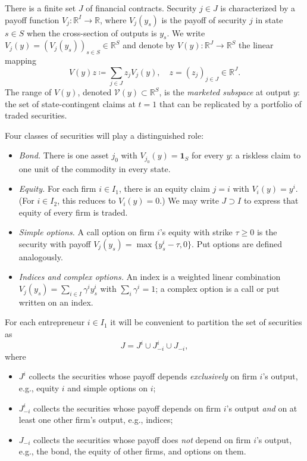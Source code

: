 \documentclass[11pt,a4paper,oneside]{book}
\def\R{\mathbb{R}}
\def\1{\mathbf{1}}
\def\geq{\geqslant}
\theoremstyle{plain}
\theoremstyle{definition}
\theoremstyle{remark}
\numberwithin{equation}{chapter}
\begin{document}
There is a finite set $J$ of financial contracts.
Security $j \in J$ is characterized by a payoff function $V_j : \R^I \to \R$, where $V_j(y_s)$ is the payoff of security $j$ in state $s \in S$ when the cross-section of outputs is $y_s$.
We write $V_j(y) = (V_j(y_s))_{s \in S} \in \R^S$ and denote by $V(y) : \R^J \to \R^S$ the linear mapping
\begin{equation*}
  V(y) z \coloneqq \sum_{j \in J} z_j V_j(y),
  \quad z = (z_j)_{j \in J} \in \R^J.
\end{equation*}
The range of $V(y)$, denoted $\mathcal{V}(y) \subset \R^S$, is the \emph{marketed subspace} at output $y$: the set of state-contingent claims at $t=1$ that can be replicated by a portfolio of traded securities.

Four classes of securities will play a distinguished role:
\begin{itemize}
  \item \emph{Bond.}
  There is one asset $j_0$ with $V_{j_0}(y) = \1_S$ for every $y$: a riskless claim to one unit of the commodity in every state.
  \item \emph{Equity.}
  For each firm $i \in I_1$, there is an equity claim $j = i$ with $V_i(y) = y^i$.
  (For $i \in I_2$, this reduces to $V_i(y) = 0$.)
  We may write $J \supset I$ to express that equity of every firm is traded.
  \item \emph{Simple options.}
  A call option on firm $i$'s equity with strike $\tau \geq 0$ is the security with payoff $V_j(y_s) = \max\{ y^i_s - \tau, 0 \}$.
  Put options are defined analogously.
  \item \emph{Indices and complex options.}
  An index is a weighted linear combination $V_j(y_s) = \sum_{i \in I} \gamma^i y^i_s$ with $\sum_i \gamma^i = 1$; a complex option is a call or put written on an index.
\end{itemize}

For each entrepreneur $i \in I_1$ it will be convenient to partition the set of securities as
\begin{equation}\label{eq:partition-J}
  J = J^i \cup J^i_{-i} \cup J_{-i},
\end{equation}
where
\begin{itemize}
  \item $J^i$ collects the securities whose payoff depends \emph{exclusively} on firm $i$'s output, e.g., equity $i$ and simple options on $i$;
  \item $J^i_{-i}$ collects the securities whose payoff depends on firm $i$'s output \emph{and} on at least one other firm's output, e.g., indices;
  \item $J_{-i}$ collects the securities whose payoff does \emph{not} depend on firm $i$'s output, e.g., the bond, the equity of other firms, and options on them.
\end{itemize}
\end{document}
